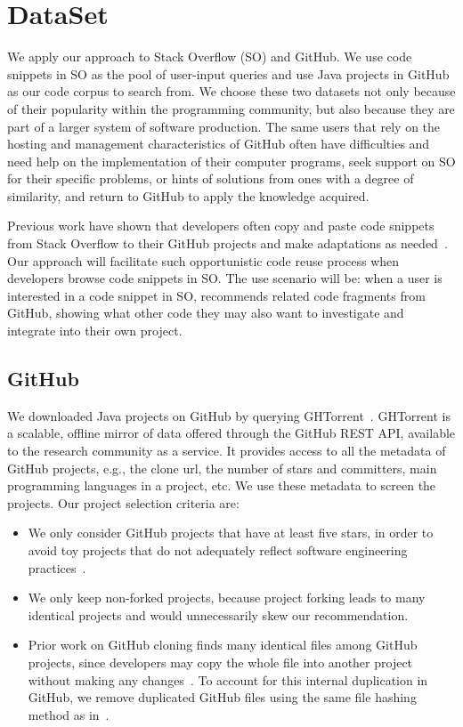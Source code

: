 \section{DataSet}
\label{sec:dataset}
We apply our approach to Stack Overflow (SO) and GitHub. We use code snippets in SO as the pool of user-input queries and use Java projects in GitHub as our code corpus to search from. We choose these two datasets not only because of their popularity within the programming community, but also because they are part of a larger system of software production. The same users that rely on the hosting and management characteristics of GitHub often have difficulties and need help on the implementation of their computer programs, seek support on SO for their specific problems, or hints of solutions from ones with a degree of similarity, and return to GitHub to apply the knowledge acquired. 

Previous work have shown that developers often copy and paste code snippets from Stack Overflow to their GitHub projects and make adaptations as needed~\cite{yang2017stack, an2017stack, wu2018developers, zhang2019analyzing}. Our approach will facilitate such opportunistic code reuse process when developers browse code snippets in SO. The use scenario will be: when a user is interested in a code snippet in SO, {\tool} recommends related code fragments from GitHub, showing what other code they may also want to investigate and integrate into their own project. 


\subsection{GitHub}
We downloaded Java projects on GitHub by querying GHTorrent~\cite{gousios2012ghtorrent}. GHTorrent is a scalable, offline mirror of data offered through the GitHub REST API, available to the research community as a service. It provides access to all the metadata of GitHub projects, e.g., the clone url, the number of stars and committers, main programming languages in a project, etc. We use these metadata to screen the projects. Our project selection criteria are:
\begin{itemize}
	\item We only consider GitHub projects that have at least five stars, in order to avoid toy projects that do not adequately reflect software engineering practices~\cite{kalliamvakou2014promises}.
	\item We only keep non-forked projects, because project forking leads to many identical projects and would unnecessarily skew our recommendation.
	\item Prior work on GitHub cloning finds many identical files among GitHub projects, since developers may copy the whole file into another project without making any changes~\cite{lopes2017dejavu}. To account for this internal duplication in GitHub, we remove duplicated GitHub files using the same file hashing method as in~\cite{lopes2017dejavu}.
\end{itemize} 

